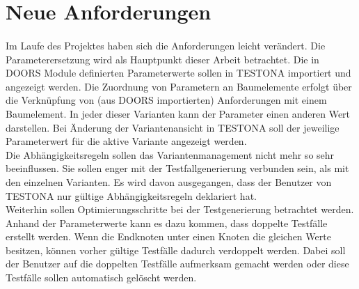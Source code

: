 \newpage
\section{Neue Anforderungen}
\paragraph{}

Im Laufe des Projektes haben sich die Anforderungen leicht verändert. Die Parameterersetzung wird als Hauptpunkt dieser Arbeit betrachtet. Die in DOORS Module definierten Parameterwerte sollen in TESTONA importiert und angezeigt werden. Die Zuordnung von Parametern an Baumelemente erfolgt über die Verknüpfung von (aus DOORS importierten) Anforderungen mit einem Baumelement. In jeder dieser Varianten kann der Parameter einen anderen Wert darstellen. Bei Änderung der Variantenansicht in TESTONA soll der jeweilige Parameterwert für die aktive Variante angezeigt werden.\\


Die Abhängigkeitsregeln sollen das Variantenmanagement nicht mehr so sehr beeinflussen. Sie  sollen  enger mit der Testfallgenerierung verbunden sein, als mit den einzelnen Varianten. Es wird davon ausgegangen, dass der Benutzer von TESTONA nur gültige Abhängigkeitsregeln deklariert hat.\\


Weiterhin sollen Optimierungsschritte bei der Testgenerierung betrachtet werden. Anhand der Parameterwerte kann es dazu kommen, dass doppelte Testfälle erstellt werden. Wenn die Endknoten unter einen Knoten die gleichen Werte besitzen, können vorher gültige Testfälle dadurch verdoppelt werden. Dabei soll der Benutzer auf die doppelten Testfälle aufmerksam gemacht werden oder diese Testfälle sollen automatisch gelöscht werden.